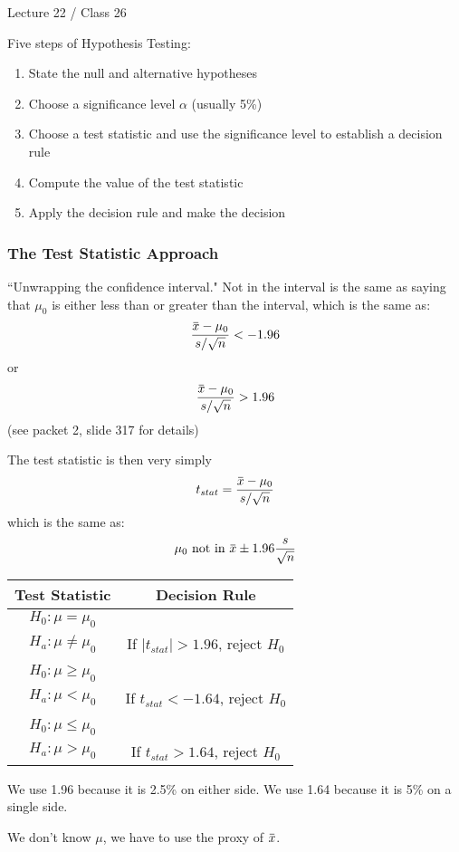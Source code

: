 \documentclass[11pt, oneside]{article}   	%
\newcommand{\overbar}[1]{\mkern 1.5mu\overline{\mkern-1.5mu#1\mkern-1.5mu}\mkern 1.5mu}
\begin{document}
Lecture 22 / Class 26

Five steps of Hypothesis Testing:
\begin{enumerate}
\item{State the null and alternative hypotheses}
\item{Choose a significance level $\alpha$ (usually 5\%)}
\item{Choose a test statistic and use the significance level to establish a decision rule}
\item{ Compute the value of the test statistic }
\item{ Apply the decision rule and make the decision }
\end{enumerate}

\subsubsection{The Test Statistic Approach}

``Unwrapping the confidence interval." Not in the interval is the same as saying that $\mu_0$ is either less than or greater than the interval, which is the same as:
\[
\frac{\overbar{x} - \mu_0}{s / \sqrt{n}} < -1.96
\]
or
\[
\frac{\overbar{x} - \mu_0}{s / \sqrt{n}} > 1.96
\]
(see packet 2, slide 317 for details)

The test statistic is then very simply
\[
t_{stat} = \frac{\overbar{x} - \mu_0}{s / \sqrt{n}}
\]
which is the same as:
\[
\mu_0 \text{ not in } \overbar{x} \pm 1.96 \frac{s}{\sqrt{n}}
\]

\begin{tabular}{ c  c }
Test Statistic & Decision Rule \\
\hline
$H_0 : \mu = \mu_0$ \\      $H_a : \mu \neq \mu_0$ & If $|t_{stat}| > 1.96$, reject $H_0$ \\
 & \\
$H_0 : \mu \geq \mu_0$ \\ $H_a : \mu < \mu_0$      & If $t_{stat} < -1.64$, reject $H_0$ \\
 & \\
$H_0 : \mu \leq \mu_0$ \\ $H_a : \mu > \mu_0$      & If $t_{stat} > 1.64$, reject $H_0$ \\
\end{tabular}

We use 1.96 because it is 2.5\% on either side. We use 1.64 because it is 5\% on a single side.

We don't know $\mu$, we have to use the proxy of $\overbar{x}$. 
\end{document}
